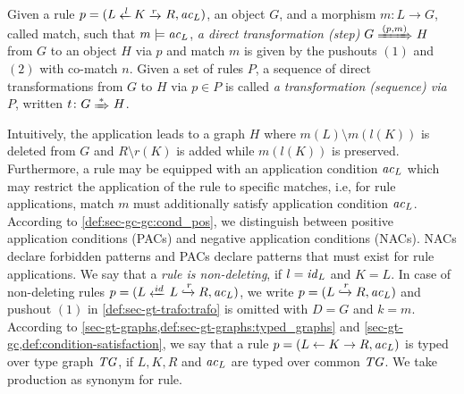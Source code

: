 \vspace{-1.5ex}
\begin{definition}
\label{def:sec-gt-trafo:trafo}
Given a rule $p=(L \transB{l} K \trans{r} R, \ac_L)$, an object $G$, and a morphism $m\colon L \to G$, called match, such that $m \models \mathit{ac}_L$, \emph{a direct transformation (step) $G \Trans{(p,m)} H$} from $G$ to an object $H$ via $p$ and match $m$ is given by the pushouts $(1)$ and $(2)$ with co-match $n$.
Given a set of rules $P$, a sequence of direct transformations from $G$ to $H$ via $p \in P$ is called \emph{a transformation (sequence) via $P$}, written $t\colon G \Trans{*} H$.
\envEndMarker
\end{definition}

Intuitively, the application leads to a graph $H$ where $m(L) \setminus m(l(K))$ is deleted from $G$ and $R \setminus r(K)$ is added while $m(l(K))$ is preserved.
Furthermore, a rule may be equipped with an application condition $\mathit{ac}_L$ which may restrict the application of the rule to specific matches, i.e, for rule applications, match $m$ must additionally satisfy application condition $\mathit{ac}_L$.
According to \cref{def:sec-gc-gc:cond_pos}, we distinguish between positive application conditions (PACs) and negative application conditions (NACs).
NACs declare forbidden patterns and PACs declare patterns that must exist for rule applications.
We say that a \emph{rule is non-deleting}, if $l=\mathit{id}_L$ and $K=L$.
In case of non-deleting rules $p=(L \transB{id} L \xhookrightarrow{r} R,\ac_L)$, we write $p=(L \xhookrightarrow{r} R,\mathit{ac}_L)$ and pushout $(1)$ in \cref{def:sec-gt-trafo:trafo} is omitted with $D=G$ and $k=m$.
According to \cref{sec-gt-graphs,def:sec-gt-graphs:typed_graphs} and \cref{sec-gt-gc,def:condition-satisfaction}, we say that a rule $p=(L \gets K \to R,\mathit{ac}_L)$ is typed over type graph $\mathit{TG}$, if $L,K,R$ and $\mathit{ac}_L$ are typed over common $\mathit{TG}$.
We take production as synonym for rule.

